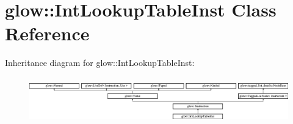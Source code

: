\hypertarget{classglow_1_1_int_lookup_table_inst}{}\section{glow\+:\+:Int\+Lookup\+Table\+Inst Class Reference}
\label{classglow_1_1_int_lookup_table_inst}
Inheritance diagram for glow\+:\+:Int\+Lookup\+Table\+Inst\+:\begin{figure}[H]
\begin{center}
\leavevmode
\includegraphics[height=1.991111cm]{classglow_1_1_int_lookup_table_inst}
\end{center}
\end{figure}
